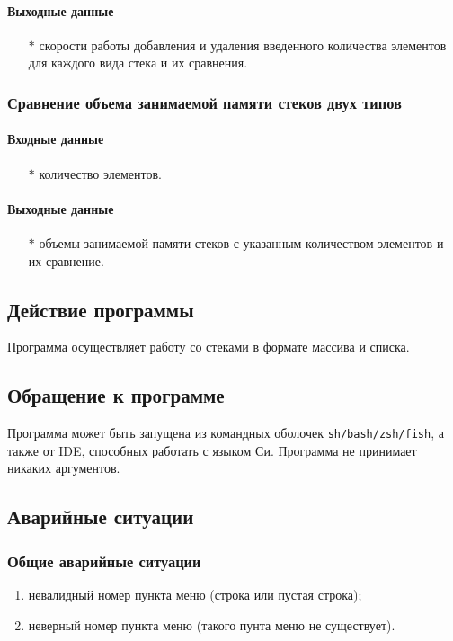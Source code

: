\documentclass[a4paper,12pt]{extarticle}
\begin{document}
\paragraph{Выходные данные}
\begin{itemize}
    \item[$*$] скорости работы добавления и удаления введенного количества элементов для каждого вида стека и их сравнения.
\end{itemize}


\subsubsection{Сравнение объема занимаемой памяти стеков двух типов}


\paragraph{Входные данные}
\begin{itemize}
    \item[$*$] количество элементов.
\end{itemize}

\paragraph{Выходные данные}
\begin{itemize}
    \item[$*$] объемы занимаемой памяти стеков с указанным количеством элементов и их сравнение.
\end{itemize}


\subsection{Действие программы}
Программа осуществляет работу со стеками в формате массива и списка.

\subsection{Обращение к программе}
Программа может быть запущена из командных оболочек \texttt{sh/bash/zsh/fish}, а также от IDE, способных работать с языком Си. Программа не принимает никаких аргументов.

\subsection{Аварийные ситуации}
\subsubsection{Общие аварийные ситуации}
\begin{enumerate}
    \item невалидный номер пункта меню (строка или пустая строка);
    \item неверный номер пункта меню (такого пунта меню не существует).
\end{enumerate}
\end{document}
